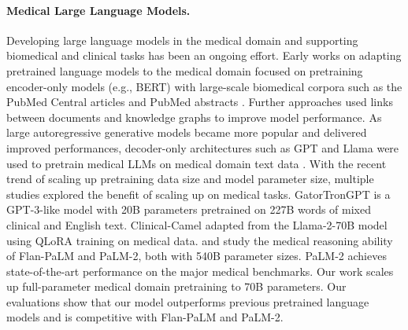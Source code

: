\documentclass{article}
\newcommand{\llama}{\textnormal{Llama}}
\begin{document}
\paragraph{Medical Large Language Models.}
Developing large language models in the medical domain and supporting biomedical and clinical tasks has been an ongoing effort. Early works on adapting pretrained language models to the medical domain focused on pretraining encoder-only models (e.g., BERT) with large-scale biomedical corpora such as the PubMed Central articles and PubMed abstracts \citep{pubmedbert, biobert}. Further approaches used links between documents \citep{biolinkbert} and knowledge graphs \citep{Yasunaga2022DeepBL} to improve model performance.
As large autoregressive generative models became more popular and delivered improved performances, decoder-only architectures such as GPT \citep{gpt} and \llama{} \citep{llama} were used to pretrain medical LLMs on medical domain text data \citep{biomedlm, wu2023pmcllama}. With the recent trend of scaling up pretraining data size and model parameter size, multiple studies explored the benefit of scaling up on medical tasks. GatorTronGPT \citep{gatortrongpt} is a GPT-3-like \citep{gpt-3} model with 20B parameters pretrained on 227B words of mixed clinical and English text. Clinical-Camel \citep{toma2023clinical} adapted from the \llama-2-70B \citep{llama2} model using QLoRA \citep{dettmers2023qlora} training on medical data. \citet{medpalm} and \citet{medpalm2} study the medical reasoning ability of Flan-PaLM and PaLM-2, both with 540B parameter sizes. PaLM-2 achieves state-of-the-art performance on the major medical benchmarks. Our work scales up full-parameter medical domain pretraining to 70B parameters. Our evaluations show that our model outperforms previous pretrained language models and is competitive with Flan-PaLM and PaLM-2.

\vspace{-5pt}
\end{document}
